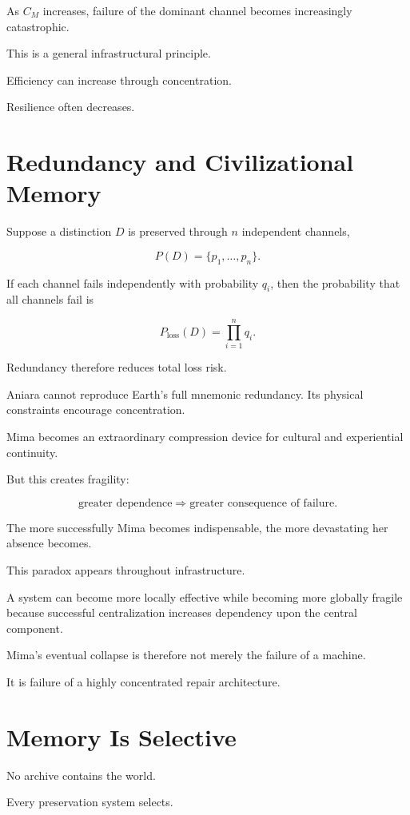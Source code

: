 \documentclass[11pt,oneside]{book}
\theoremstyle{definition}
\theoremstyle{remark}
\begin{document}
As \(C_M\) increases, failure of the dominant channel becomes increasingly catastrophic.

This is a general infrastructural principle.

Efficiency can increase through concentration.

Resilience often decreases.

\section{Redundancy and Civilizational Memory}

Suppose a distinction \(D\) is preserved through \(n\) independent channels,

\[
P(D)
=
\{p_1,\ldots,p_n\}.
\]

If each channel fails independently with probability \(q_i\), then the probability that all channels fail is

\[
P_{\mathrm{loss}}(D)
=
\prod_{i=1}^{n}q_i.
\]

Redundancy therefore reduces total loss risk.

Aniara cannot reproduce Earth's full mnemonic redundancy. Its physical constraints encourage concentration.

Mima becomes an extraordinary compression device for cultural and experiential continuity.

But this creates fragility:

\[
\text{greater dependence}
\Rightarrow
\text{greater consequence of failure}.
\]

The more successfully Mima becomes indispensable, the more devastating her absence becomes.

This paradox appears throughout infrastructure.

A system can become more locally effective while becoming more globally fragile because successful centralization increases dependency upon the central component.

Mima's eventual collapse is therefore not merely the failure of a machine.

It is failure of a highly concentrated repair architecture.

\section{Memory Is Selective}

No archive contains the world.

Every preservation system selects.
\end{document}
